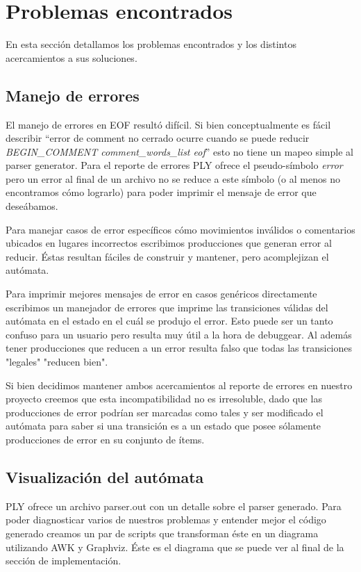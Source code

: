 \section{Problemas encontrados}
En esta sección detallamos los problemas encontrados y los distintos acercamientos a sus soluciones.

\subsection{Manejo de errores}
El manejo de errores en EOF resultó difícil. Si bien conceptualmente es fácil describir ``error de comment no cerrado ocurre cuando se puede reducir \textit{BEGIN\_COMMENT comment\_words\_list eof}'' esto no tiene un mapeo simple al parser generator. Para el reporte de errores PLY ofrece el pseudo-símbolo \textit{error} pero un error al final de un archivo no se reduce a este símbolo (o al menos no encontramos cómo lograrlo) para poder imprimir el mensaje de error que deseábamos.

Para manejar casos de error específicos cómo movimientos inválidos o comentarios ubicados en lugares incorrectos escribimos producciones que generan error al reducir. Éstas resultan fáciles de construir y mantener, pero acomplejizan el autómata.

Para imprimir mejores mensajes de error en casos genéricos directamente escribimos un manejador de errores que imprime las transiciones válidas del autómata en el estado en el cuál se produjo el error. Esto puede ser un tanto confuso para un usuario pero resulta muy útil a la hora de debuggear. Al además tener producciones que reducen a un error resulta falso que todas las transiciones "legales" "reducen bien".

Si bien decidimos mantener ambos acercamientos al reporte de errores en nuestro proyecto creemos que esta incompatibilidad no es irresoluble, dado que las producciones de error podrían ser marcadas como tales y ser modificado el autómata para saber si una transición es a un estado que posee sólamente producciones de error en su conjunto de ítems.

\subsection{Visualización del autómata}
PLY ofrece un archivo parser.out con un detalle sobre el parser generado. Para poder diagnosticar varios de nuestros problemas y entender mejor el código generado creamos un par de scripts que transforman éste en un diagrama utilizando AWK y Graphviz. Éste es el diagrama que se puede ver al final de la sección de implementación.

